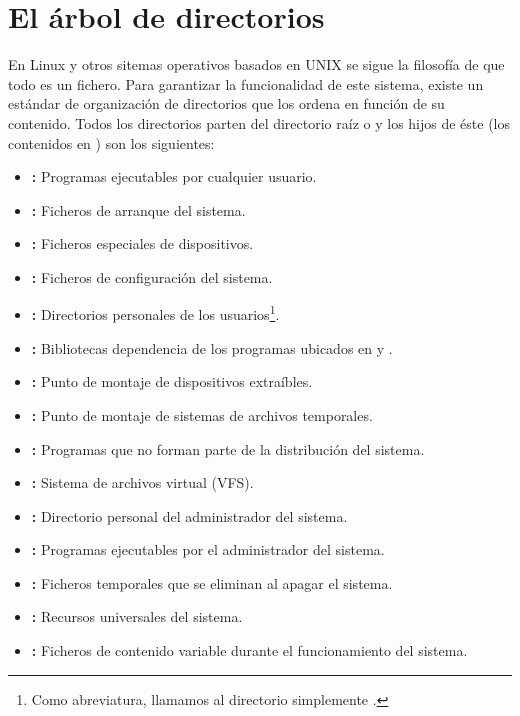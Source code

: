 \section{El árbol de directorios}

En Linux y otros sitemas operativos basados en UNIX se sigue la filosofía de que todo es un fichero.
Para garantizar la funcionalidad de este sistema, existe un estándar de organización de directorios que los ordena en función de su contenido.
Todos los directorios parten del directorio raíz o \code{/} y los hijos de éste (los contenidos en \code{/}) son los siguientes:

\begin{itemize}
	\item{}\textbf{:} Programas ejecutables por cualquier usuario.
	\item{}\textbf{:} Ficheros de arranque del sistema.
	\item{}\textbf{:} Ficheros especiales de dispositivos.
	\item{}\textbf{:} Ficheros de configuración del sistema.
	\item{}\textbf{:} Directorios personales de los usuarios\footnote{Como abreviatura, llamamos al directorio  simplemente \code{\~{}}.}.
	\item{}\textbf{:} Bibliotecas dependencia de los programas ubicados en  y .
	\item{}\textbf{:} Punto de montaje de dispositivos extraíbles.
	\item{}\textbf{:} Punto de montaje de sistemas de archivos temporales.
	\item{}\textbf{:} Programas que no forman parte de la distribución del sistema.
	\item{}\textbf{:} Sistema de archivos virtual (VFS).
	\item{}\textbf{:} Directorio personal del administrador del sistema.
	\item{}\textbf{:} Programas ejecutables por el administrador del sistema.
	\item{}\textbf{:} Ficheros temporales que se eliminan al apagar el sistema.
	\item{}\textbf{:} Recursos universales del sistema.
	\item{}\textbf{:} Ficheros de contenido variable durante el funcionamiento del sistema.
\end{itemize}

